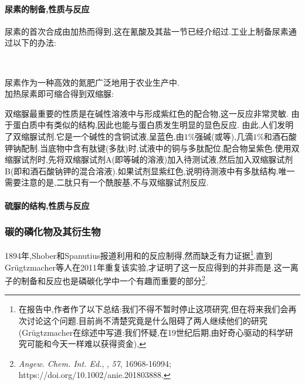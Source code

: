 \documentclass{ctexart}
\begin{document}
\paragraph{尿素的制备,性质与反应}
尿素的首次合成由加热而得到,这在氰酸及其盐一节已经介绍过.工业上制备尿素通过以下的办法:
\begin{center}
    \\
\end{center}
尿素作为一种高效的氮肥广泛地用于农业生产中.\\
\indent 加热尿素即可缩合得到双缩脲:
\begin{center}
\end{center}
双缩脲最重要的性质是在碱性溶液中与形成紫红色的配合物,这一反应非常灵敏.
由于蛋白质中有类似的结构,因此也能与蛋白质发生明显的显色反应.
由此,人们发明了双缩脲试剂.它是一个碱性的含铜试液,呈蓝色,由$1\%$强碱(或等),几滴$1\%$和酒石酸钾钠配制.当底物中含有肽键(多肽)时,试液中的铜与多肽配位,配合物呈紫色.使用双缩脲试剂时,先将双缩脲试剂A(即等碱的溶液)加入待测试液,然后加入双缩脲试剂B(即和酒石酸钠钾的混合溶液).如果试剂显紫红色,说明待测液中有多肽结构.唯一需要注意的是,二肽只有一个酰胺基,不与双缩脲试剂反应.
\paragraph{硫脲的结构,性质与反应}
\subsubsection{碳的磷化物及其衍生物}
1894年,Shober和Spanutius报道利用和的反应制得,然而缺乏有力证据\footnote{在报告中,作者作了以下总结:我们不得不暂时停止这项研究,但在将来我们会再次讨论这个问题.目前尚不清楚究竟是什么阻碍了两人继续他们的研究(Grügtzmacher在综述中写道:我们怀疑,在19世纪后期,由好奇心驱动的科学研究可能和今天一样难以获得资金),}.直到Grügtzmacher等人在2011年重复该实验,才证明了这一反应得到的并非而是.这一离子的制备和反应也是磷碳化学中一个有趣而重要的部分\footnote{\textit{Angew. Chem. Int. Ed.}, , \textit{57}, 16968-16994; https://doi.org/10.1002/anie.201803888.}.
\end{document}
